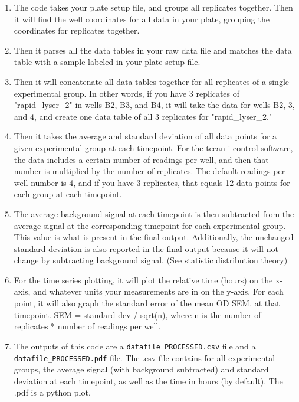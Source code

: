 \documentclass[12pt]{article}
\begin{document}
\begin{enumerate}
\item The code takes your plate setup file, and groups all replicates
together. Then it will find the well coordinates for all data in your
plate, grouping the coordinates for replicates together.

\item Then it parses all the data tables in your raw data file and matches
the data table with a sample labeled in your plate setup file.

\item Then it will concatenate all data tables together for all replicates
of a single experimental group. In other words, if you have 3
replicates of "rapid\_lyser\_2" in wells B2, B3, and B4, it will take
the data for wells B2, 3, and 4, and create one data table of all 3
replicates for "rapid\_lyser\_2."

\item Then it takes the average and standard deviation of all data points
for a given experimental group at each timepoint. For the tecan
i-control software, the data includes a certain number of readings
per well, and then that number is multiplied by the number of
replicates. The default readings per well number is 4, and if you
have 3 replicates, that equals 12 data points for each group at each
timepoint.

\item The average background signal at each timepoint is then subtracted
from the average signal at the corresponding timepoint for each
experimental group. This value is what is present in the final
output. Additionally, the unchanged standard deviation is also
reported in the final output because it will not change by
subtracting background signal. (See statistic distribution theory)

\item For the time series plotting, it will plot the relative time (hours)
on the x-axis, and whatever units your measurements are in on the
y-axis. For each point, it will also graph the standard error of the
mean OD \textpm{} SEM. at that timepoint. SEM = standard dev / sqrt(n), where
n is the number of replicates * number of readings per well.

\item The outputs of this code are a \texttt{datafile\_PROCESSED.csv} file and a
\texttt{datafile\_PROCESSED.pdf} file. The .csv file contains for all
experimental groups, the average signal (with background subtracted)
and standard deviation at each timepoint, as well as the time in
hours (by default). The .pdf is a python plot.
\end{enumerate}
\end{document}
